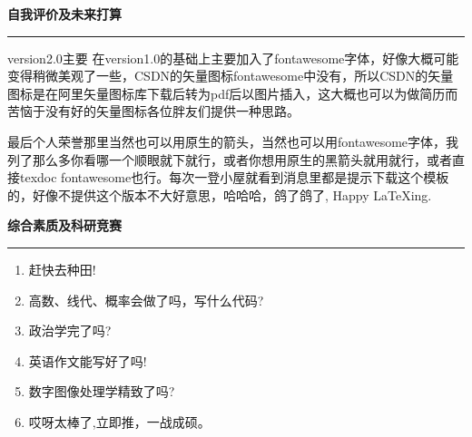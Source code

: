 \documentclass[a4paper,12pt,final,UTF8,fontset=macnew]{memoir}
\newcommand{\CVSection}[1]
    {\Large\textbf{#1}\par\smallskip
     \hrule%
     \smallskip
     \normalsize\normalfont}
\begin{document}
\CVSection{自我评价及未来打算}
     \vspace{1em}
     {
     \begin{varwidth}{32em}
          \setlength\parindent{2em}
     \par version2.0主要 在version1.0的基础上主要加入了fontawesome字体，好像大概可能变得稍微美观了一些，CSDN的矢量图标fontawesome中没有，所以CSDN的矢量图标是在阿里矢量图标库下载后转为pdf后以图片插入，这大概也可以为做简历而苦恼于没有好的矢量图标各位胖友们提供一种思路。
    \par 最后个人荣誉那里当然也可以用原生的箭头，当然也可以用fontawesome字体，我列了那么多你看哪一个顺眼就下就行，或者你想用原生的黑箭头就用就行，或者直接texdoc fontawesome也行。每次一登小屋就看到消息里都是提示下载这个模板的，好像不提供这个版本不大好意思，哈哈哈，鸽了鸽了, Happy \LaTeX ing.
      \end{varwidth}
    }

\vspace{2em}

\CVSection{综合素质及科研竞赛} 
    \begin{varwidth}{32em}
    \begin{enumerate}
        \item 赶快去种田!
        \item 高数、线代、概率会做了吗，写什么代码?
        \item 政治学完了吗?
        \item 英语作文能写好了吗!
        \item 数字图像处理学精致了吗?
        \item 哎呀太棒了,立即推，一战成硕。
    \end{enumerate}
    \end{varwidth}
\end{document}
